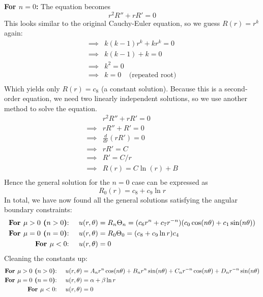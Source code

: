 \documentclass[12pt]{article}
\begin{document}
{\textbf{For $n = 0$:} The equation becomes 
$$r^2 R'' + r R' = 0$$
This looks similar to the original Cauchy-Euler equation, so we guess $R(r) = r^k$ again:
\begin{align*}
\implies& k(k - 1) r^k + k r^k = 0 \\
\implies& k(k - 1) + k  = 0 \\
\implies& k^2 =  0 \\
\implies& k = 0 \;\;\;\; \text{(repeated root)} \\
\end{align*}
Which yields only $R(r) = c_8$ (a constant solution). Because this is a second-order equation, we need two linearly independent solutions, so we use another method to solve the equation.
\begin{align*}
& r^2 R'' + r R' = 0 \\
\implies& r R'' + R' = 0 \\
\implies& \frac{d}{dr} \left( rR' \right) = 0 \\
\implies& rR' = C \\
\implies& R' = C/r \\
\implies& R(r) = C \ln (r) + B \\
\end{align*}
Hence the general solution for the $n=0$ case can be expressed as $$R_0(r) = c_8 + c_9 \ln r$$
In total, we have now found all the general solutions satisfying the angular boundary constraints: \\
\begin{align*}
\text{\textbf{For $\mu > 0$ ($n > 0$)}:} \;\;\;\;\; & u(r, \theta) = R_n \Theta_n = (c_6 r^n + c_7 r^{-n})(c_0 \cos(n\theta) + c_1 \sin(n \theta)) \\
\text{\textbf{For $\mu = 0$ ($n = 0$)}:} \;\;\;\;\; & u(r, \theta) = R_0 \Theta_0 = (c_8 + c_9 \ln r) c_4 \\
\text{\textbf{For $\mu < 0$}:} \;\;\;\;\; & u(r, \theta) = 0
\end{align*}
Cleaning the constants up:
\begin{align*}
\text{\textbf{For $\mu > 0$ ($n > 0$)}:} \;\;\;\;\; & u(r, \theta) = A_n r^n \cos(n\theta) + B_n r^n \sin(n\theta) + C_n r^{-n} \cos(n \theta) + D_n r^{-n} \sin(n \theta) \\
\text{\textbf{For $\mu = 0$ ($n = 0$)}:} \;\;\;\;\; & u(r, \theta) = \alpha + \beta \ln r  \\
\text{\textbf{For $\mu < 0$}:} \;\;\;\;\; & u(r, \theta) = 0\\ 
\end{align*}
}
\end{document}
